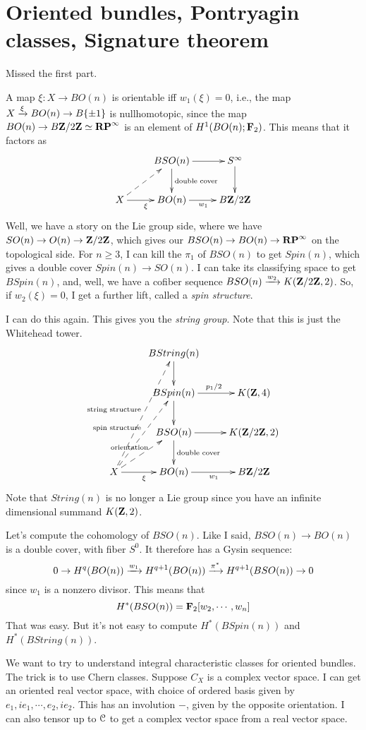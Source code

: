 \section{Oriented bundles, Pontryagin classes, Signature theorem}
Missed the first part.

A map $\xi:X\to BO(n)$ is orientable iff $w_1(\xi) = 0$, i.e., the map $X\xrightarrow{{\xi}} BO(n)\to B\{\pm 1\}$ is nullhomotopic, since the map $BO(n) \to B\mathbf Z/2\mathbf Z\simeq\mathbf{RP}^\infty$ is an element of $H^1(BO(n);\mathbf F_2)$.
This means that it factors as
$$
\xymatrix{
    & BSO(n)\ar[r]\ar[d]^{\text{double cover}} & S^\infty\ar[d]\\
    X\ar@{-->}[ur]\ar[r]_{\xi} & BO(n)\ar[r]_{w_1} & B\Z/2\Z
}
$$
Well, we have a story on the Lie group side, where we have $SO(n)\to O(n)\to\mathbf Z/2\mathbf Z$, which gives our $BSO(n)\to BO(n)\to \mathbf{RP}^\infty$ on the topological side.
For $n\geq 3$, I can kill the $\pi_1$ of $BSO(n)$ to get $Spin(n)$, which gives a double cover $Spin(n)\to SO(n)$.
I can take its classifying space to get $BSpin(n)$, and, well, we have a cofiber sequence $BSO(n)\xrightarrow{{w_2}} K(\mathbf Z/2\mathbf Z,2)$.
So, if $w_2(\xi) = 0$, I get a further lift, called a \emph{spin structure}.

I can do this again.
This gives you the \emph{string group}.
Note that this is just the Whitehead tower.
$$
\xymatrix{
    & BString(n)\ar[d] & \\
    & BSpin(n)\ar[d] \ar[r]^{p_1/2} & K(\Z,4)\\
    & BSO(n)\ar[r]\ar[d]^{\text{double cover}} & K(\Z/2\Z,2)\\
    X\ar@{-->}[ur]^{\text{orientation}}\ar@{-->}[uur]^{\text{spin structure}}\ar@{-->}[uuur]^{\text{string structure}}\ar[r]_{\xi} & BO(n)\ar[r]_{w_1} & B\Z/2\Z
}
$$
Note that $String(n)$ is no longer a Lie group since you have an infinite dimensional summand $K(\mathbf Z,2)$.

Let's compute the cohomology of $BSO(n)$.
Like I said, $BSO(n)\to BO(n)$ is a double cover, with fiber $S^0$.
It therefore has a Gysin sequence:
$$
0\to H^q(BO(n)) \xrightarrow{{w_1}} H^{q+1}(BO(n)) \xrightarrow{{\pi^\ast}} H^{q+1}(BSO(n)) \to 0
$$
since $w_1$ is a nonzero divisor.
This means that
$$
H^\ast(BSO(n)) = \mathbf F_2[w_2,\cdots,w_n]
$$
That was easy.
But it's not easy to compute $H^\ast(BSpin(n))$ and $H^\ast(BString(n))$.

We want to try to understand integral characteristic classes for oriented bundles.
The trick is to use Chern classes.
Suppose $C_X$ is a complex vector space.
I can get an oriented real vector space, with choice of ordered basis given by $e_1,ie_1,\cdots,e_2,ie_2$.
This has an involution $-$, given by the opposite orientation.
I can also tensor up to $\mathcal C$ to get a complex vector space from a real vector space.


